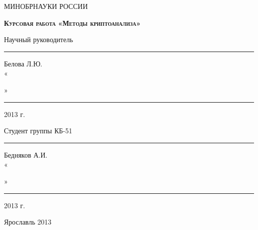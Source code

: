 \begin{titlepage}
    \begin{center}
        МИНОБРНАУКИ РОССИИ
        \linebreak

        \vspace{48pt}{
        Федеральное государственное бюджетное образовательное 
        учреждение высшего профессионального образования
        \linebreak
        «Ярославский государственный университет им. П.Г. Демидова»
        }
        \linebreak

        \vspace{1em}{
        Кафедра компьютерной безопасности и
        математических методов обработки информации
        }
    \end{center}

    \vspace{1em}

    \begin{center}
        \textsc{\textbf{Курсовая работа}}
        \linebreak
        \textsc{\textbf{«Методы криптоанализа»}}
    \end{center}

    \vspace{6em}

	\begin{flushright}
        Научный руководитель \\
        \rule{2,2cm}{1pt} Белова Л.Ю. \\
        «\rule{0,5cm}{1pt}» \rule{2,5cm}{1pt} 2013 г.

        \vspace{1.5em}

        Студент группы КБ-51 \\
        \rule{2cm}{1pt} Бедняков А.И. \\
        «\rule{0,5cm}{1pt}» \rule{2,5cm}{1pt} 2013 г.
	\end{flushright}

    \vspace{\fill}

    \begin{center}
        Ярославль 2013
    \end{center}
\end{titlepage}

